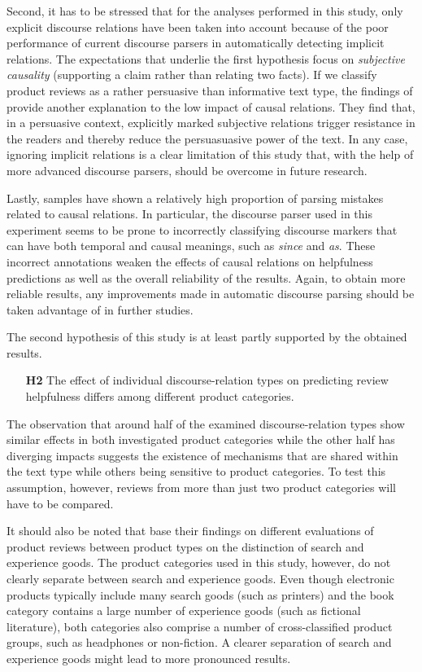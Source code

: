 \documentclass[
    a4paper,%
    12pt,%
    oneside,%
    toc=bibliography,
    final,
]{scrartcl}
\begin{document}
Second, it has to be stressed that for the analyses performed in this study, only explicit discourse relations have been taken into account because of the poor performance of current discourse parsers in automatically detecting implicit relations. The expectations that underlie the first hypothesis focus on \textit{subjective causality} (supporting a claim rather than relating two facts). If we classify product reviews as a rather persuasive than informative text type, the findings of \citet{Kamalski2008} provide another explanation to the low impact of causal relations. They find that, in a persuasive context, explicitly marked subjective relations trigger resistance in the readers and thereby reduce the persuasuasive power of the text. In any case, ignoring implicit relations is a clear limitation of this study that, with the help of more advanced discourse parsers, should be overcome in future research.

Lastly, samples have shown a relatively high proportion of parsing mistakes related to causal relations. In particular, the discourse parser used in this experiment seems to be prone to incorrectly classifying discourse markers that can have both temporal and causal meanings, such as \textit{since} and \textit{as}. These incorrect annotations weaken the effects of causal relations on helpfulness predictions as well as the overall reliability of the results. Again, to obtain more reliable results, any improvements made in automatic discourse parsing should be taken advantage of in further studies.


The second hypothesis of this study is at least partly supported by the obtained results.

\begin{enumerate}[rightmargin=1cm]
\item[\textbf{H2}] The effect of individual discourse-relation types on predicting review helpfulness differs among different product categories.
\end{enumerate}

The observation that around half of the examined discourse-relation types show similar effects in both investigated product categories while the other half has diverging impacts suggests the existence of mechanisms that are shared within the text type while others being sensitive to product categories. To test this assumption, however, reviews from more than just two product categories will have to be compared.

It should also be noted that \citet{MudambiSchuff2010} base their findings on different evaluations of product reviews between product types on the distinction of search and experience goods. The product categories used in this study, however, do not clearly separate between search and experience goods. Even though electronic products typically include many search goods (such as printers) and the book category contains a large number of experience goods (such as fictional literature), both categories also comprise a number of cross-classified product groups, such as headphones or non-fiction. A clearer separation of search and experience goods might lead to more pronounced results.
\end{document}
